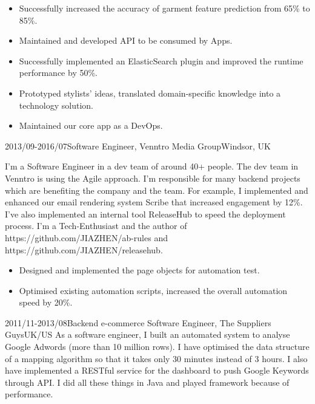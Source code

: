 \documentclass[a4paper]{twentysecondcv-english} %
\begin{document}
\begin{twenty}
{\begin{itemize}
                \item Successfully increased the accuracy of garment feature prediction from 65\% to 85\%.
                \item Maintained and developed API to be consumed by Apps.
                \item Successfully implemented an ElasticSearch plugin and improved the runtime performance by 50\%.
                \item Prototyped stylists' ideas, translated domain-specific knowledge into a technology solution.
                \item Maintained our core app as a DevOps.
            \end{itemize}}
    \twentyitem
	    {2013/09-2016/07}{Software Engineer, Venntro Media Group}{Windsor, UK}
    	{I'm a Software Engineer in a dev team of around 40+ people. The dev team in Venntro is using the Agile approach. I'm responsible for many backend projects which are benefiting the company and the team. For example, I implemented and enhanced our email rendering system Scribe that increased engagement by 12\%. I've also implemented an internal tool ReleaseHub to speed the deployment process. I'm a Tech-Enthusiast and the author of https://github.com/JIAZHEN/ab-rules and https://github.com/JIAZHEN/releasehub.
        	\begin{itemize}
                \item Designed and implemented the page objects for automation test.
                \item Optimised existing automation scripts, increased the overall automation speed by 20\%.
            \end{itemize}}
\end{twenty}

\newpage %
\makesidebar

\begin{twenty} %
    \twentyitem
	    {2011/11-2013/08}{Backend e-commerce Software Engineer, The Suppliers Guys}{UK/US}
    	{As a software engineer, I built an automated system to analyse Google Adwords (more than 10 million rows). I have optimised the data structure of a mapping algorithm so that it takes only 30 minutes instead of 3 hours. I also have implemented a RESTful service for the dashboard to push Google Keywords through API. I did all these things in Java and played framework because of performance.}
\end{twenty}
\end{document}
